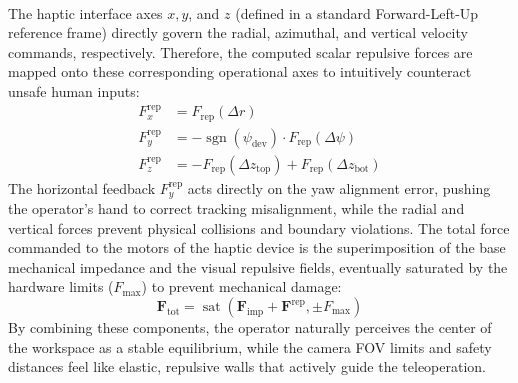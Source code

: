 \\The   haptic interface axes $x, y$, and $z$ (defined in a standard Forward-Left-Up reference frame) directly govern the radial, azimuthal, and vertical velocity commands, respectively. Therefore, the computed scalar repulsive forces are mapped onto these corresponding operational axes to intuitively counteract unsafe human inputs:
\begin{equation}
\begin{aligned}
    F_{x}^{\text{rep}} &= F_{\text{rep}}(\Delta r) \\
    F_{y}^{\text{rep}} &= - \operatorname{sgn}(\psi_{\text{dev}}) \cdot F_{\text{rep}}(\Delta \psi) \\
    F_{z}^{\text{rep}} &= - F_{\text{rep}}(\Delta z_{\text{top}}) + F_{\text{rep}}(\Delta z_{\text{bot}})
\end{aligned}
\end{equation}
The horizontal feedback $F_{y}^{\text{rep}}$ acts directly on the yaw alignment error, pushing the operator's hand to correct tracking misalignment, while the radial and vertical forces prevent physical collisions and boundary violations.
The total force commanded to the motors of the haptic device is the superimposition of the base mechanical impedance and the visual repulsive fields, eventually saturated by the hardware limits ($F_{\max}$) to prevent mechanical damage:
\begin{equation}
    \mathbf{F}_{\text{tot}} = \operatorname{sat}\left( \mathbf{F}_{\text{imp}} + \mathbf{F}^{\text{rep}}, \pm F_{\max} \right)
\end{equation}
By combining these components, the operator naturally perceives the center of the workspace as a stable equilibrium, while the camera FOV limits and safety distances feel like elastic, repulsive walls that actively guide the teleoperation.